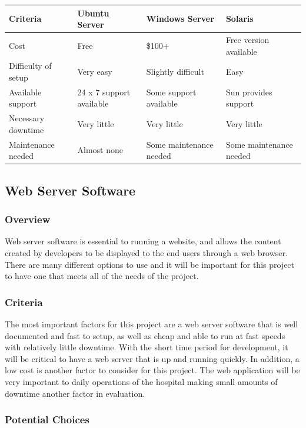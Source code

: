 \documentclass[onecolumn, draftclsnofoot,10pt, compsoc]{IEEEtran}
\begin{document}
\begin{table}[h!]
\centering
\begin{tabular}{ |l|l|l|l| } 
\hline
\textbf{Criteria} & \textbf{Ubuntu Server} & \textbf{Windows Server} & \textbf{Solaris} \\ \hline
Cost & Free & \$100+ & Free version available \\ \hline
Difficulty of setup & Very easy & Slightly difficult & Easy \\ \hline
Available support & 24 x 7 support available & Some support available & Sun provides support \\ \hline
Necessary downtime & Very little & Very little & Very little \\ \hline
Maintenance needed & Almost none & Some maintenance needed & Some maintenance needed \\ \hline
\end{tabular}
\end{table}

\subsection{Web Server Software}

\subsubsection{Overview}
Web server software is essential to running a website, and allows the content created by developers to be displayed to the end users through a web browser. There are many different options to use and it will be important for this project to have one that meets all of the needs of the project.
\subsubsection{Criteria}
The most important factors for this project are a web server software that is well documented and fast to setup, as well as cheap and able to run at fast speeds with relatively little downtime. With the short time period for development, it will be critical to have a web server that is up and running quickly. In addition, a low cost is another factor to consider for this project. The web application will be very important to daily operations of the hospital making small amounts of downtime another factor in evaluation.
\subsubsection{Potential Choices}
\end{document}
